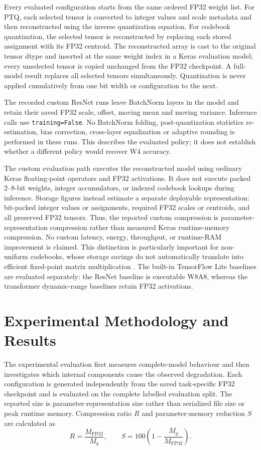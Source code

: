 \documentclass[conference]{IEEEtran}
\begin{document}
Every evaluated configuration starts from the same ordered FP32 weight list. For PTQ, each selected tensor is converted to integer values and scale metadata and then reconstructed using the inverse quantization equation. For codebook quantization, the selected tensor is reconstructed by replacing each stored assignment with its FP32 centroid. The reconstructed array is cast to the original tensor dtype and inserted at the same weight index in a Keras evaluation model; every unselected tensor is copied unchanged from the FP32 checkpoint. A full-model result replaces all selected tensors simultaneously. Quantization is never applied cumulatively from one bit width or configuration to the next.

The recorded custom ResNet runs leave BatchNorm layers in the model and retain their saved FP32 scale, offset, moving mean and moving variance. Inference calls use \texttt{training=False}. No BatchNorm folding, post-quantization statistics re-estimation, bias correction, cross-layer equalization or adaptive rounding is performed in these runs. This describes the evaluated policy; it does not establish whether a different policy would recover W4 accuracy.

The custom evaluation path executes the reconstructed model using ordinary Keras floating-point operators and FP32 activations. It does not execute packed 2--8-bit weights, integer accumulators, or indexed codebook lookups during inference. Storage figures instead estimate a separate deployable representation: bit-packed integer values or assignments, required FP32 scales or centroids, and all preserved FP32 tensors. Thus, the reported custom compression is parameter-representation compression rather than measured Keras runtime-memory compression. No custom latency, energy, throughput, or runtime-RAM improvement is claimed. This distinction is particularly important for non-uniform codebooks, whose storage savings do not automatically translate into efficient fixed-point matrix multiplication \cite{abushahla2025}. The built-in TensorFlow Lite baselines are evaluated separately: the ResNet baseline is executable W8A8, whereas the transformer dynamic-range baselines retain FP32 activations.

\section{Experimental Methodology and Results}
\label{sec:methodology-results}

The experimental evaluation first measures complete-model behaviour and then investigates which internal components cause the observed degradation. Each configuration is generated independently from the saved task-specific FP32 checkpoint and is evaluated on the complete labelled evaluation split. The reported size is parameter-representation size rather than serialized file size or peak runtime memory. Compression ratio $R$ and parameter-memory reduction $S$ are calculated as
\begin{equation}
R=\frac{M_{\mathrm{FP32}}}{M_q}, \qquad
S=100\left(1-\frac{M_q}{M_{\mathrm{FP32}}}\right).
\end{equation}
\end{document}
